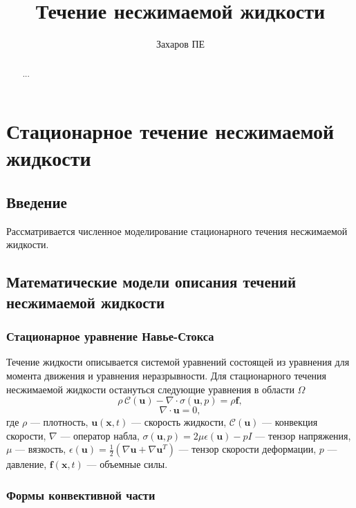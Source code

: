 \documentclass[a4paper,10pt]{report}
\title{Течение несжимаемой жидкости}
\author{Захаров ПЕ}
\begin{document}
\maketitle

\begin{abstract}
...
\end{abstract}



\chapter{Стационарное течение несжимаемой жидкости}

\section*{Введение}
Рассматривается численное моделирование стационарного течения несжимаемой жидкости. 

\section{Математические модели описания течений несжимаемой жидкости}

\subsection{Стационарное уравнение Навье-Стокса}

Течение жидкости описывается системой уравнений состоящей из уравнения для момента движения и уравнения неразрывности. Для стационарного течения несжимаемой жидкости остануться следующие уравнения в области $\Omega$
\begin{equation}
  \rho \,\mathcal{C}(\bm{u})
- \nabla \cdot \sigma(\bm{u}, p)
= \rho \bm{f},
\label{eq:navier-stokes}
\end{equation}
\begin{equation}
\nabla \cdot \bm{u} = 0,
\label{eq:incompressibility}
\end{equation}
где $\rho$ --- плотность, $\bm{u}(\bm{x}, t)$ --- скорость жидкости, $\mathcal{C}(\bm{u})$ --- конвекция скорости, $\nabla$ --- оператор набла, $\sigma(\bm{u}, p)=2 \mu \epsilon(\bm{u}) - p I$ --- тензор напряжения, $\mu$ --- вязкость, $\epsilon(\bm{u}) = \frac{1}{2}\left(\nabla \bm{u} + \nabla \bm{u}^T \right)$ --- тензор скорости деформации, $p$ --- давление, $\bm{f}(\bm{x}, t)$ --- объемные силы.

\subsection{Формы конвективной части}
\end{document}
